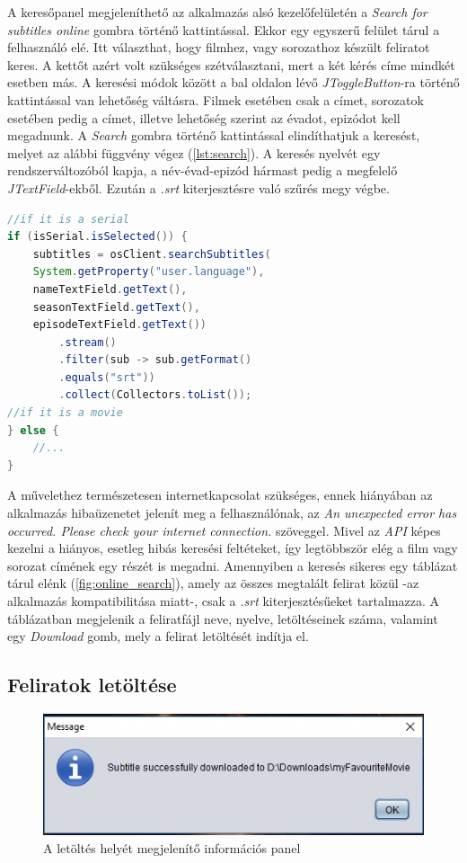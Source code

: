 A keresőpanel megjeleníthető az alkalmazás alsó kezelőfelületén a \textit{Search for subtitles online} gombra történő kattintással. Ekkor egy egyszerű felület tárul a felhasználó elé. Itt választhat, hogy filmhez, vagy sorozathoz készült feliratot keres. A kettőt azért volt szükséges szétválasztani, mert a két kérés címe mindkét esetben más. A keresési módok között a bal oldalon lévő \textit{JToggleButton}-ra történő kattintással van lehetőség váltásra. Filmek esetében csak a címet, sorozatok esetében pedig a címet, illetve lehetőség szerint az évadot, epizódot kell megadnunk. A \textit{Search} gombra történő kattintással elindíthatjuk a keresést, melyet az alábbi függvény végez (\ref{lst:search}). A keresés nyelvét egy rendszerváltozóból kapja, a név-évad-epizód hármast pedig a megfelelő \textit{JTextField}-ekből. Ezután a \textit{.srt} kiterjesztésre való szűrés megy végbe. 

\begin{lstlisting}[caption=Feliratok keresése sorozatokhoz valamint filmekhez, label={lst:search}, language=java]
//if it is a serial
if (isSerial.isSelected()) {
    subtitles = osClient.searchSubtitles(
    System.getProperty("user.language"),
    nameTextField.getText(),
    seasonTextField.getText(),
    episodeTextField.getText())
        .stream()
        .filter(sub -> sub.getFormat()
        .equals("srt"))
        .collect(Collectors.toList());
//if it is a movie
} else {
    //...
}
\end{lstlisting}
A művelethez természetesen internetkapcsolat szükséges, ennek hiányában az alkalmazás hibaüzenetet jelenít meg a felhasználónak, az \textit{An unexpected error has occurred. Please check your internet connection.} szöveggel. Mivel az \textit{API} képes kezelni a hiányos, esetleg hibás keresési feltéteket, így legtöbbször elég a film vagy sorozat címének egy részét is megadni. Amennyiben a keresés sikeres egy táblázat tárul elénk (\ref{fig:online_search}), amely az összes megtalált felirat közül -az alkalmazás kompatibilitása miatt-, csak a \textit{.srt} kiterjesztésűeket tartalmazza. A táblázatban megjelenik a feliratfájl neve, nyelve, letöltéseinek száma, valamint egy \textit{Download} gomb, mely a felirat letöltését indítja el.

\subsection{Feliratok letöltése}

\begin{figure}
  \includegraphics[width=\linewidth]{images/downloaded_sub.jpg}
  \caption{A letöltés helyét megjelenítő információs panel}
  \label{fig:downloaded_sub}
\end{figure}

